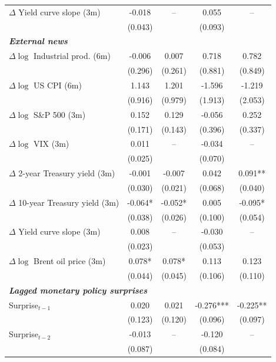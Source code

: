 \documentclass[\latexroot/\projectname]{subfiles}
\begin{document}
\begin{table}[htbp]
\begin{center}
{\begin{tabular}{lcccc}
$\Delta$ Yield curve slope (3m)
& -0.018 & -- 
& 0.055 & -- \\
& (0.043) & 
& (0.093) & \\[0.4em]

\multicolumn{5}{l}{\textbf{\emph{External news}}} \\[0.2em]

$\Delta \log$ Industrial prod. (6m)
& -0.006 & 0.007 
& 0.718 & 0.782 \\
& (0.296) & (0.261)
& (0.881) & (0.849) \\

$\Delta \log$ US CPI (6m)
& 1.143 & 1.201 
& -1.596 & -1.219 \\
& (0.916) & (0.979)
& (1.913) & (2.053) \\

$\Delta \log$ S\&P 500 (3m)
& 0.152 & 0.129 
& -0.056 & 0.252 \\
& (0.171) & (0.143)
& (0.396) & (0.337) \\

$\Delta \log$ VIX (3m)
& 0.011 & -- 
& -0.034 & -- \\
& (0.025) & 
& (0.070) & \\

$\Delta$ 2-year Treasury yield (3m)
& -0.001 & -0.007 
& 0.042 & 0.091** \\
& (0.030) & (0.021)
& (0.068) & (0.040) \\

$\Delta$ 10-year Treasury yield (3m)
& -0.064* & -0.052* 
& 0.005 & -0.095* \\
& (0.038) & (0.026)
& (0.100) & (0.054) \\

$\Delta$ Yield curve slope (3m)
& 0.008 & -- 
& -0.030 & -- \\
& (0.023) & 
& (0.053) & \\

$\Delta \log$ Brent oil price (3m)
& 0.078* & 0.078* 
& 0.113 & 0.123 \\
& (0.044) & (0.045)
& (0.106) & (0.110) \\[0.4em]

\multicolumn{5}{l}{\textbf{\emph{Lagged monetary policy surprises}}} \\[0.2em]

Surprise$_{t-1}$
& 0.020 & 0.021 
& -0.276*** & -0.225** \\
& (0.123) & (0.120)
& (0.096) & (0.097) \\

Surprise$_{t-2}$
& -0.013 & -- 
& -0.120 & -- \\
& (0.087) & 
& (0.084) & \\


\end{tabular}}
\end{center}
\end{table}
\end{document}
